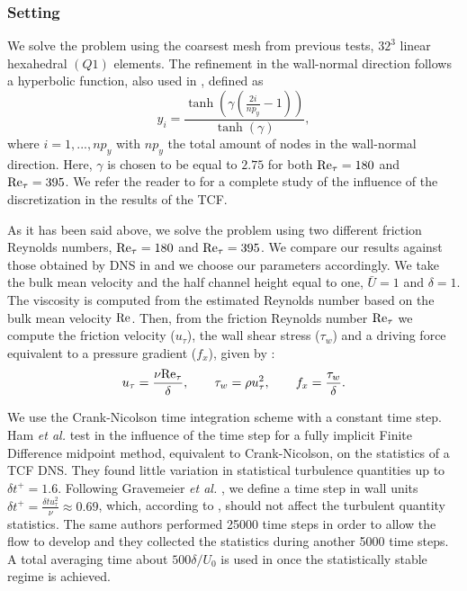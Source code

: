 \subsubsection{Setting}
\label{subsubsec-C4_TCF_setting}

We solve the problem using the coarsest mesh from previous tests, $32^3$ linear hexahedral $(Q1)$ elements. The refinement in the wall-normal direction follows a hyperbolic function, also used in \cite{Calderer2013,  gamnitzer_time-dependent_2010,  gravemeier_algebraic_2010, gullbrand_effect_2003, masud_variational_2011}, defined as 
$$y_i=\frac{\tanh\left(\gamma\left(\frac{2i}{np_y}-1\right)\right)}{\tanh(\gamma)},$$
where $i=1,...,np_y$ with $np_y$ the total amount of nodes in the wall-normal direction. Here, $\gamma$ is  chosen to be equal to $2.75$ for both  ${\rm Re}_\tau=180$ and ${\rm Re}_\tau=395$.  We refer the reader to \cite{Avila2014} for a complete study of the influence of the discretization in the results of the TCF.

As it has been said above, we solve the problem using two different friction Reynolds numbers, ${\rm Re}_\tau=180$ and ${\rm Re}_\tau=395$. We compare our results against those obtained by DNS in \cite{moser_direct_1999,kim_turbulence_1987} and we choose our parameters accordingly.
We take the bulk mean velocity and the half channel height equal to one, $\bar{U}=1$ and $\delta=1$. The viscosity is computed from the estimated Reynolds number based on the bulk mean velocity ${\rm Re}$. Then, from the friction Reynolds number ${\rm Re}_\tau$ we compute the friction velocity ($u_\tau$), the wall shear stress ($\tau_w$) and a driving force equivalent to a pressure gradient ($f_x$), given by  \cite{pope_turbulent_2000}:
$$u_\tau=\frac{\nu {\rm Re}_\tau}{\delta},\quad\quad\tau_w=\rho u_\tau^2,\quad\quad
f_x=\frac{\tau_w}{\delta}.$$

We use the Crank-Nicolson time integration scheme with a constant time step. Ham \emph{et al.}  test in \cite{ham_fully_2002} the influence of the time step for a fully implicit Finite Difference midpoint method, equivalent to Crank-Nicolson, on the statistics of a TCF DNS. They found little variation in statistical turbulence quantities up to $\delta t^+=1.6$. Following Gravemeier \emph{et al.} \cite{gravemeier_algebraic_2010}, we define a time step in wall units $\delta t^+=\frac{\delta tu_\tau^2}{\nu}\approx0.69$, which, according to \cite{ham_fully_2002}, should not affect the turbulent quantity statistics. The same authors performed 25000 time steps in order to allow the flow to develop and they collected the statistics during another 5000 time steps. A total averaging time about $500\delta/U_0$ is used in \cite{choi_effects_1994} once the statistically stable regime is achieved.

